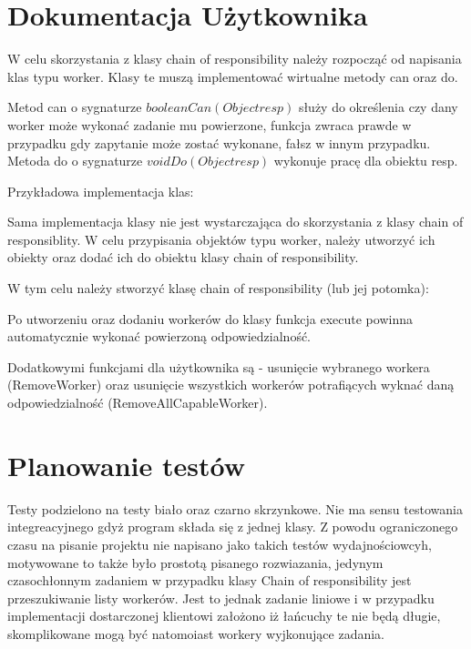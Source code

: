 \documentclass[paper=a4, fontsize=11pt]{scrartcl} %
\numberwithin{equation}{section} %
\numberwithin{figure}{section} %
\numberwithin{table}{section} %
\begin{document}
\section{Dokumentacja Użytkownika}


W celu skorzystania z klasy chain of responsibility należy rozpocząć od napisania klas typu worker.
Klasy te muszą implementować wirtualne metody can oraz do.

Metod can o sygnaturze \(boolean Can(Object resp)\) służy do określenia czy dany worker może wykonać
zadanie mu powierzone, funkcja zwraca prawde w przypadku gdy zapytanie może zostać wykonane, fałsz 
w innym przypadku.
Metoda do o sygnaturze \(void Do (Object resp)\) wykonuje pracę dla obiektu resp.

Przykładowa implementacja klas:



Sama implementacja klasy nie jest wystarczająca do skorzystania z klasy chain of responsiblity.
W celu przypisania objektów typu worker, należy utworzyć ich obiekty oraz dodać ich do obiektu klasy
chain of responsibility.

W tym celu należy stworzyć klasę chain of responsibility (lub jej potomka):



Po utworzeniu oraz dodaniu workerów do klasy funkcja execute powinna automatycznie wykonać powierzoną 
odpowiedzialność.

Dodatkowymi funkcjami dla użytkownika są - usunięcie wybranego workera (RemoveWorker) oraz usunięcie
wszystkich workerów potrafiących wyknać daną odpowiedzialność (RemoveAllCapableWorker).

\section{Planowanie testów}

Testy podzielono na testy biało oraz czarno skrzynkowe. Nie ma sensu testowania integreacyjnego
gdyż program składa się z jednej klasy. Z powodu ograniczonego czasu na pisanie projektu nie napisano
jako takich testów wydajnościowcyh, motywowane to także było prostotą pisanego rozwiazania, jedynym
czasochłonnym zadaniem w przypadku klasy Chain of responsibility jest przeszukiwanie listy workerów. Jest
to jednak zadanie liniowe i w przypadku implementacji dostarczonej klientowi założono iż łańcuchy te nie będą
długie, skomplikowane mogą być natomoiast workery wyjkonujące zadania.
\end{document}
